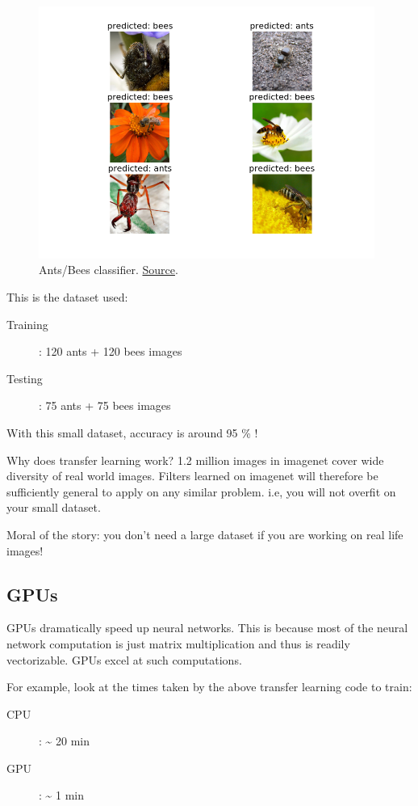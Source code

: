 \documentclass[a4paper]{tufte-handout}
\begin{document}
\begin{figure}
\includegraphics[width=110mm]{transfer_learning.png}
\caption{Ants/Bees classifier.
\href{http://pytorch.org/tutorials/beginner/transfer_learning_tutorial.html}{Source}.
}  
\end{figure}

This is the dataset used:
\begin{description}
\item[Training]: 120 ants + 120 bees images
\item[Testing]: 75 ants + 75 bees images
\end{description}

With this small dataset, accuracy is around 95 \% !

Why does transfer learning work? 1.2 million images in imagenet cover
wide diversity of real world images. Filters learned on imagenet will
therefore be sufficiently general to apply on any similar problem. i.e,
you will not overfit on your small dataset.

Moral of the story: you don't need a large dataset if you are working on
real life images!

\subsection{GPUs}\label{gpus}

GPUs dramatically speed up neural networks. This is because most of the
neural network computation is just matrix multiplication and thus is
readily vectorizable. GPUs excel at such computations.

For example, look at the times taken by the above transfer learning code to
train:

\begin{description}
\item[CPU]: \textasciitilde{} 20 min
\item[GPU]: \textasciitilde{} 1 min
\end{description}
\end{document}
